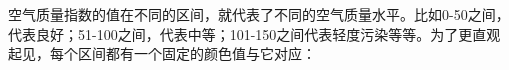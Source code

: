 \documentclass[preview]{standalone}
\begin{document}
\begin{center}
空气质量指数的值在不同的区间，就代表了不同的空气质量水平。比如0-50之间，代表良好；51-100之间，代表中等；101-150之间代表轻度污染等等。为了更直观起见，每个区间都有一个固定的颜色值与它对应：
\end{center}
\end{document}
